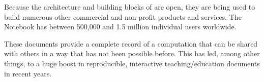 Because the architecture and building blocks of \Jupyter are open,
they are being used to build numerous other commercial and non-profit
products and services. The \Jupyter Notebook has between 500,000 and
1.5 million individual users worldwide.

These documents provide a complete record of a computation that
can be shared with others in a way that has not been possible
before. This has led, among other things, to a huge boost in
reproducible, interactive teaching/education documents in recent
years.



